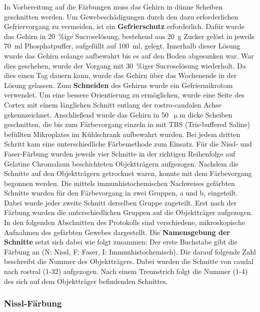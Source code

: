 In Vorbereitung auf die Färbungen muss das Gehirn in dünne Scheiben geschnitten werden. Um Gewebeschädigungen durch den dazu erforderlichen Gefriervorgang zu vermeiden, ist ein \textbf{Gefrierschutz} erforderlich. Dafür wurde das Gehirn in 20~\%ige Sucroselösung, bestehend aus 20~g Zucker gelöst in jeweils 70~ml Phosphatpuffer, aufgefüllt auf 100~ml, gelegt. Innerhalb dieser Lösung wurde das Gehirn solange aufbewahrt bis es auf den Boden abgesunken war. War dies geschehen, wurde der Vorgang mit 30~\%iger Sucroselösung wiederholt. Da dies einen Tag dauern kann, wurde das Gehirn über das Wochenende in der Lösung gelassen. Zum \textbf{Schneiden} des Gehirns wurde ein Gefriermikrotom verwendet. Um eine bessere Orientierung zu ermöglichen, wurde eine Seite des Cortex mit einem länglichen Schnitt entlang der rostro-caudalen Achse gekennzeichnet. Anschließend wurde das Gehirn in 50~$\upmu$m dicke Scheiben geschnitten, die bis zum Färbevorgang einzeln in mit TBS (Tris-buffered Saline) befüllten Mikroplates im Kühlschrank aufbewahrt wurden. Bei jedem dritten Schritt kam eine unterschiedliche Färbemethode zum Einsatz. Für die Nissl- und Faser-Färbung wurden jeweils vier Schnitte in der richtigen Reihenfolge auf Gelatine Chromalaun beschichteten Objektträgern aufgezogen. Nachdem die Schnitte auf den Objektträgern getrocknet waren, konnte mit dem Färbevorgang begonnen werden. Die mittels immunhistochemischen Nachweises gefärbten Schnitte wurden für den Färbevorgang in zwei Gruppen, a und b, eingeteilt. Dabei wurde jeder zweite Schnitt derselben Gruppe zugeteilt. Erst nach der Färbung wurden die unterschiedlichen Gruppen auf die Objektträger aufgezogen. In den folgenden Abschnitten des Protokolls sind verschiedene, mikroskopische Aufnahmen des gefärbten Gewebes dargestellt. Die \textbf{Namensgebung der Schnitte} setzt sich dabei wie folgt zusammen: Der erste Buchstabe gibt die Färbung an (N: Nissl, F: Faser, I: Immunhistochemisch). Die darauf folgende Zahl beschreibt die Nummer des Objektträgers. Dabei wurden die Schnitte von caudal nach rostral (1-32) aufgezogen. Nach einem Trennstrich folgt die Nummer (1-4) des sich auf dem Objektträger befindenden Schnittes.

\subsubsection{Nissl-Färbung}

